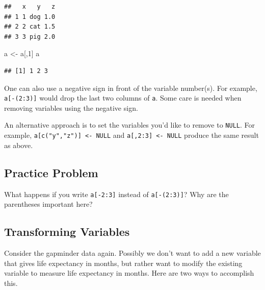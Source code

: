 \documentclass[
]{krantz}
\newenvironment{Shaded}{\begin{snugshade}}{\end{snugshade}}
\newcommand{\DecValTok}[1]{\textcolor[rgb]{0.00,0.00,0.81}{#1}}
\newcommand{\KeywordTok}[1]{\textcolor[rgb]{0.13,0.29,0.53}{\textbf{#1}}}
\newcommand{\NormalTok}[1]{#1}
\newcommand{\OperatorTok}[1]{\textcolor[rgb]{0.81,0.36,0.00}{\textbf{#1}}}
\newcommand{\StringTok}[1]{\textcolor[rgb]{0.31,0.60,0.02}{#1}}
\begin{document}
\begin{verbatim}
##   x   y   z
## 1 1 dog 1.0
## 2 2 cat 1.5
## 3 3 pig 2.0
\end{verbatim}

\begin{Shaded}
\begin{Highlighting}[]
\NormalTok{a \textless{}{-}}\StringTok{ }\NormalTok{a[,}\DecValTok{1}\NormalTok{]}
\NormalTok{a}
\end{Highlighting}
\end{Shaded}

\begin{verbatim}
## [1] 1 2 3
\end{verbatim}

One can also use a negative sign in front of the variable number(s). For example, \texttt{a{[}-(2:3){]}} would drop the last two columns of \texttt{a}. Some care is needed when removing variables using the negative sign.

An alternative approach is to set the variables you'd like to remove to \texttt{NULL}. For example, \texttt{a{[}c("y","z"){]}\ \textless{}-\ NULL} and \texttt{a{[},2:3{]}\ \textless{}-\ NULL} produce the same result as above.

\hypertarget{ch6PP2}{%
\subsection{Practice Problem}\label{ch6PP2}}

What happens if you write \texttt{a{[}-2:3{]}} instead of \texttt{a{[}-(2:3){]}}? Why are the parentheses important here?

\hypertarget{transforming-variables}{%
\subsection{Transforming Variables}\label{transforming-variables}}

Consider the gapminder data again. Possibly we don't want to add a new variable that gives life expectancy in months, but rather want to modify the existing variable to measure life expectancy in months. Here are two ways to accomplish this.

\begin{Shaded}
\end{Shaded}
\end{document}
